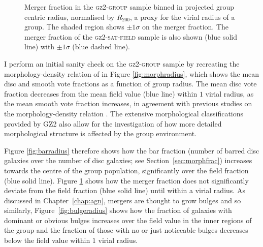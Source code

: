 \begin{figure}
\caption{Merger fraction in the \textsc{gz2-group} sample binned in projected group centric radius, normalised by $R_{200}$, a proxy for the virial radius of a group. The shaded region shows $\pm1\sigma$ on the merger fraction. The merger fraction of the \textsc{gz2-sat-field} sample is also shown (blue solid line) with $\pm1\sigma$ (blue dashed line).}
\label{fig:mergerradius}
\end{figure}


I perform an initial sanity check on the \textsc{gz2-group} sample by recreating the morphology-density relation of \citet{dressler80} in Figure \ref{fig:morphradius}, which shows the mean disc and smooth vote fractions as a function of group radius. The mean disc vote fraction decreases from the mean field value (blue line) within $1$ virial radius, as the mean smooth vote fraction increases, in agreement with previous studies on the morphology-density relation \citep{dressler80, smail97, poggianti99, postman05, Bamford09}. The extensive morphological classifications provided by GZ2 also allow for the investigation of how more detailed morphological structure is affected by the group environment.  

Figure \ref{fig:barradius} therefore  shows how the bar fraction (number of barred disc galaxies over the number of disc galaxies; see Section~\ref{sec:morphfrac}) increases towards the centre of the group population, significantly over the field fraction (blue solid line). Figure \ref{fig:mergerradius} shows how the merger fraction does not significantly deviate from the field fraction (blue solid line) until within a virial radius. As discussed in Chapter~\ref{chap:agn}, mergers are thought to grow bulges and so similarly, Figure~\ref{fig:bulgeradius} shows how the fraction of galaxies with dominant or obvious bulges increases over the field value in the inner regions of the group and the fraction of those with no or just noticeable bulges decreases below the field value within $1$ virial radius. 

